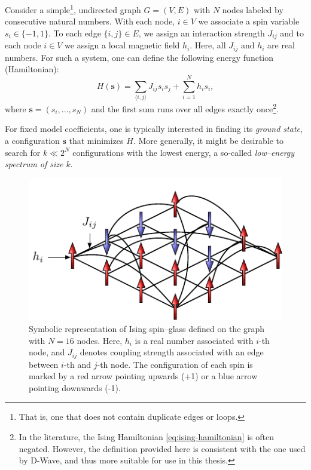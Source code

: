 Consider a simple\footnote{That is, one that does not contain duplicate edges
  or loops.}, undirected graph $G = (V, E)$ with $N$ nodes labeled by consecutive
natural numbers. With each node, $i \in V$ we associate a spin variable $s_i
  \in \{-1, 1\}$. To each edge $\{i, j\} \in E$, we assign an interaction
strength $J_{ij}$ and to each node $i \in V$ we assign a local magnetic field
$h_i$. Here, all $J_{ij}$ and $h_i$ are real numbers. For such a system, one
can define the following energy function (Hamiltonian):
\begin{equation}
  \label{eq:ising-hamiltonian}
  H(\mathbf{s}) = \sum_{\langle i, j \rangle} J_{ij} s_i s_j +  \sum_{i=1}^N h_i s_i,
\end{equation}
where $\mathbf{s} = (s_i, \ldots, s_N)$ and the first sum runs over all edges exactly once\footnote{
  In the
  literature, the Ising Hamiltonian \eqref{eq:ising-hamiltonian} is often negated. However, the
  definition provided here is consistent with the one used by D-Wave, and thus more suitable for use
  in this thesis.}.

For fixed model coefficients, one is typically interested in finding its
\emph{ground state}, a configuration $\mathbf{s}$ that minimizes $H$. More
generally, it might be desirable to search for $k \ll 2^N$ configurations with
the lowest energy, a so-called \emph{low--energy spectrum of size $k$}.

\begin{figure}[H]
  \centering
  \includegraphics{figures/spins.pdf}
  \caption{Symbolic representation of Ising spin--glass defined on the graph with $N=16$ nodes. Here, $h_i$ is a real number associated with $i$-th node, and $J_{ij}$ denotes coupling strength associated with an edge between $i$-th and $j$-th node. The configuration of each spin is marked by a red arrow pointing upwards (+1) or a blue arrow pointing downwards (-1).}
  \label{fig:my_label}
\end{figure}

